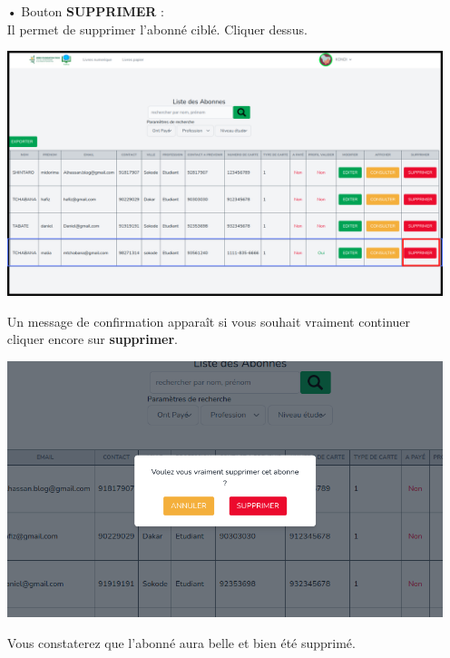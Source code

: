 \documentclass[12pt,a4paper]{article}
\begin{document}
\begin{itemize}
\item[•] Bouton \textbf{SUPPRIMER} : \\
Il permet de supprimer l'abonné ciblé. Cliquer dessus. 
\begin{center}
\includegraphics[scale=0.33]{img/abonne_delete.png}
\end{center}Un message de confirmation apparaît si vous souhait vraiment continuer cliquer encore sur \textbf{supprimer}. 
\begin{center}
\includegraphics[scale=0.56]{img/abonne_delete_confirm.png}
\end{center}
Vous constaterez que l'abonné aura belle et bien été supprimé.
\end{itemize}
\end{document}
